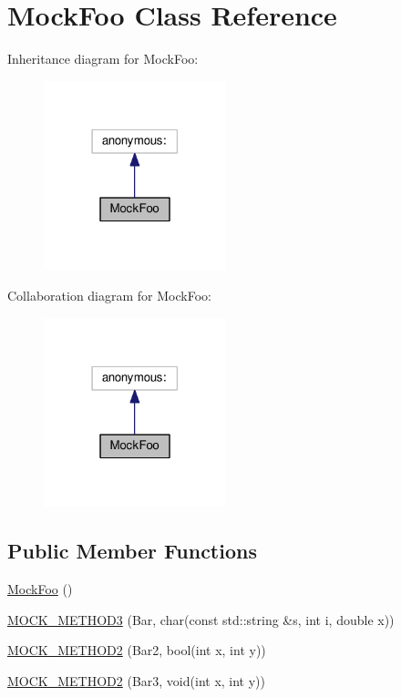 \hypertarget{class_mock_foo}{}\section{Mock\+Foo Class Reference}
\label{class_mock_foo}


Inheritance diagram for Mock\+Foo\+:
\nopagebreak
\begin{figure}[H]
\begin{center}
\leavevmode
\includegraphics[width=150pt]{class_mock_foo__inherit__graph}
\end{center}
\end{figure}


Collaboration diagram for Mock\+Foo\+:
\nopagebreak
\begin{figure}[H]
\begin{center}
\leavevmode
\includegraphics[width=150pt]{class_mock_foo__coll__graph}
\end{center}
\end{figure}
\subsection*{Public Member Functions}
\begin{DoxyCompactItemize}
\item 
\hyperlink{class_mock_foo_a2821e632963d0ea4af66a7ce7ed36a8f}{Mock\+Foo} ()
\item 
\hyperlink{class_mock_foo_a8f323a65afd93c0605a02b278b101d18}{M\+O\+C\+K\+\_\+\+M\+E\+T\+H\+O\+D3} (Bar, char(const std\+::string \&s, int i, double x))
\item 
\hyperlink{class_mock_foo_ae1d53263d5efcf38fda3990302fac6ab}{M\+O\+C\+K\+\_\+\+M\+E\+T\+H\+O\+D2} (Bar2, bool(int x, int y))
\item 
\hyperlink{class_mock_foo_af1e0c374cadacdaa7ca69f9c38d85543}{M\+O\+C\+K\+\_\+\+M\+E\+T\+H\+O\+D2} (Bar3, void(int x, int y))
\end{DoxyCompactItemize}


